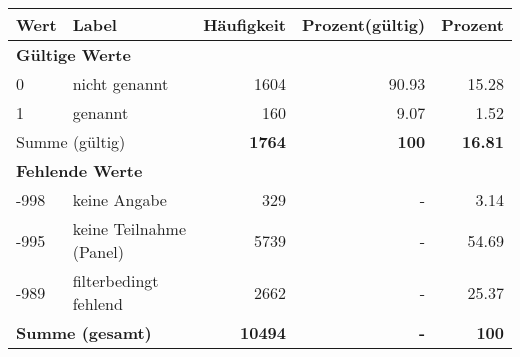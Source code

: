      \begin{longtable}{lXrrr}
     \toprule
     \textbf{Wert} & \textbf{Label} & \textbf{Häufigkeit} & \textbf{Prozent(gültig)} & \textbf{Prozent} \\
     \endhead
     \midrule
     \multicolumn{5}{l}{\textbf{Gültige Werte}}\\

     0 &
     \multicolumn{1}{X}{ nicht genannt   } &


       \num{1604} &
       \num[round-mode=places,round-precision=2]{90.93} &
         \num[round-mode=places,round-precision=2]{15.28} \\

     1 &
     \multicolumn{1}{X}{ genannt   } &


       \num{160} &
       \num[round-mode=places,round-precision=2]{9.07} &
         \num[round-mode=places,round-precision=2]{1.52} \\
     \midrule
     \multicolumn{2}{l}{Summe (gültig)} &
       \textbf{\num{1764}} &
     \textbf{\num{100}} &
       \textbf{\num[round-mode=places,round-precision=2]{16.81}} \\
     \multicolumn{5}{l}{\textbf{Fehlende Werte}}\\
       -998 &
       keine Angabe &
         \num{329} &
        - &
         \num[round-mode=places,round-precision=2]{3.14} \\
       -995 &
       keine Teilnahme (Panel) &
         \num{5739} &
        - &
         \num[round-mode=places,round-precision=2]{54.69} \\
       -989 &
       filterbedingt fehlend &
         \num{2662} &
        - &
         \num[round-mode=places,round-precision=2]{25.37} \\
     \midrule
     \multicolumn{2}{l}{\textbf{Summe (gesamt)}} &
          \textbf{\num{10494}} &
        \textbf{-} &
        \textbf{\num{100}} \\
     \bottomrule
     \end{longtable}
     
